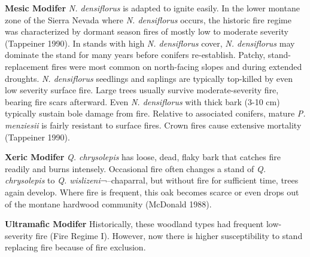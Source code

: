 \begin{adjustwidth}{2cm}{}
\textbf{Mesic Modifer }
\emph{N. densiflorus} is adapted to ignite easily. In the lower montane zone of the Sierra Nevada where \emph{N. densiflorus} occurs, the historic fire regime was characterized by dormant season fires of mostly low to moderate severity (Tappeiner 1990). In stands with high \emph{N. densiflorus} cover, \emph{N. densiflorus} may dominate the stand for many years before conifers re-establish. Patchy, stand-replacement fires were most common on north-facing slopes and during extended droughts. \emph{N. densiflorus} seedlings and saplings are typically top-killed by even low severity surface fire. Large trees usually survive moderate-severity fire, bearing fire scars afterward. Even \emph{N. densiflorus} with thick bark (3-10 cm) typically sustain bole damage from fire. Relative to associated conifers, mature \emph{P. menziesii} is fairly resistant to surface fires. Crown fires cause extensive mortality (Tappeiner 1990).

\medskip
\noindent \textbf{Xeric Modifer} \emph{Q. chrysolepis} has loose, dead, flaky bark that catches fire readily and burns intensely. Occasional fire often changes a stand of \emph{Q. chrysolepis} to \emph{Q. wislizeni}¬–chaparral, but without fire for sufficient time, trees again develop. Where fire is frequent, this oak becomes scarce or even drops out of the montane hardwood community (McDonald 1988).

\medskip
\noindent \textbf{Ultramafic Modifer} Historically, these woodland types had frequent low-severity fire (Fire Regime I). However, now there is higher susceptibility to stand replacing fire because of fire exclusion.

\end{adjustwidth}



